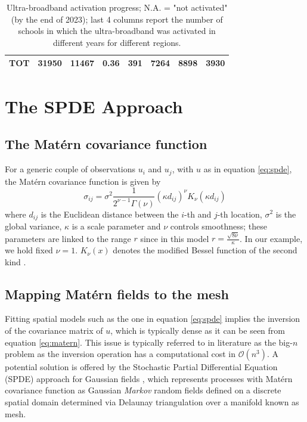 \documentclass{book}
\begin{document}
\begin{appendices}
\begin{table}[ht]
{\begin{tabular}{lrrrrrrr}
      \hline
      TOT & 31950 & 11467 & 0.36 & 391 & 7264 & 8898 & 3930 \\ 
       \hline
    \end{tabular}
 }
  \caption{Ultra-broadband activation progress; N.A. = "not activated" (by the end of 2023); last 4 columns report the number of schools in which the ultra-broadband was activated in different years for different regions.  }
  \label{tab:broadband}
 \end{table}





\newpage
\section{The SPDE Approach} \label{Appendix2}

\subsection{The Matérn covariance function} \label{subsection:Matern}
For a generic couple of observations $u_i$ and $u_j$, with $u$ as in equation \ref{eq:spde}, the Matérn covariance function is given by
%
\begin{equation}
\sigma_{ij} =\sigma^2 \frac{1}{2^{\nu-1}\Gamma(\nu)} \left(\kappa  d_{ij}\right)^{\nu}
K_{\nu}(\kappa d_{ij}) 
\label{eq:matern}
\end{equation}
%
where $d_{ij}$ is the Euclidean distance between the $i$-th and $j$-th location, $\sigma^2$ is the global variance,  $\kappa$ is a scale parameter and $\nu$ controls smoothness; these parameters are linked to the range $r$ since in this model $r = \frac{\sqrt{8\nu}}{\kappa}$. In our example, we hold fixed $\nu = 1$. $K_{\nu}(x)$ denotes the modified Bessel function of the second kind \citep[][, Section 9.6]{AS}.
%
\subsection{Mapping Matérn fields to the mesh} \label{subsection:SPDE}
Fitting spatial models such as the one in equation \ref{eq:spde} implies the inversion of the covariance matrix of $u$, which is typically dense as it can be seen from equation \ref{eq:matern}. This issue is typically referred to in literature as the big-$n$ problem \citep{bigN} as the inversion operation has a computational cost in $\mathcal{O}(n^3)$. A potential solution is offered by the Stochastic Partial Differential Equation (SPDE) approach for Gaussian fields \citep{SPDE,SPDE2}, which represents processes with Matérn covariance function as Gaussian \textit{Markov} random fields \citep{GMRFs} defined on a discrete spatial domain determined via Delaunay triangulation over a manifold known as mesh. 


\end{appendices}
\end{document}
